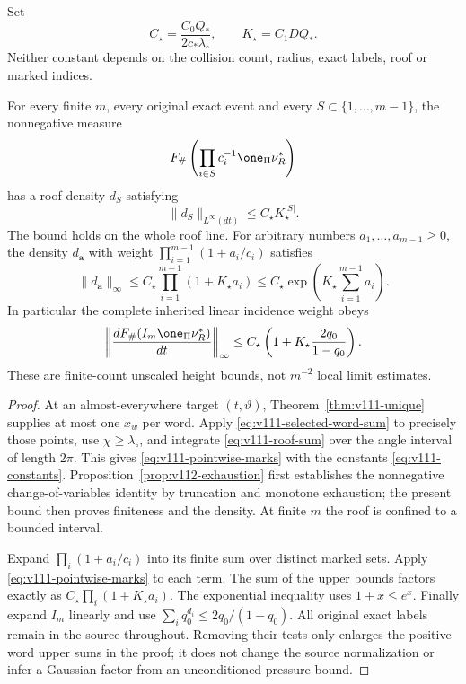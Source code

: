 Set
\begin{equation}\label{eq:v111-constants}
       C_\star=\frac{C_0Q_*}{2c_*\lambda_\circ},\qquad
       K_\star=C_1DQ_*.
\end{equation}
Neither constant depends on the collision count, radius, exact
labels, roof or marked indices.

\begin{theorem}
\label{thm:v111-roof-pressure}
For every finite $m$, every original exact event and every
$S\subset\{1,\ldots,m-1\}$, the nonnegative measure
\[
 F_\#\left(\prod_{i\in S}c_i^{-1}\one_\Pi\nu_R^*\right)
\]
has a roof density $d_S$ satisfying
\begin{equation}\label{eq:v111-pointwise-marks}
                    \|d_S\|_{L^\infty(dt)}\le C_\star K_\star^{|S|}.
\end{equation}
The bound holds on the whole roof line. For arbitrary numbers
$a_1,\ldots,a_{m-1}\ge0$, the density $d_{\boldsymbol a}$ with
weight $\prod_{i=1}^{m-1}(1+a_i/c_i)$ satisfies
\begin{equation}\label{eq:v111-product-insertion}
 \|d_{\boldsymbol a}\|_\infty
 \le C_\star\prod_{i=1}^{m-1}(1+K_\star a_i)
 \le C_\star\exp\left(K_\star\sum_{i=1}^{m-1}a_i\right).
\end{equation}
In particular the complete inherited linear incidence weight obeys
\begin{equation}\label{eq:v111-linear}
 \left\|\frac{dF_\#(I_m\one_\Pi\nu_R^*)}{dt}\right\|_\infty
 \le C_\star\left(1+K_\star\frac{2q_0}{1-q_0}\right).
\end{equation}
These are finite-count unscaled height bounds, not $m^{-2}$ local
limit estimates.
\end{theorem}
\begin{proof}
At an almost-everywhere target $(t,\vartheta)$,
Theorem~\ref{thm:v111-unique} supplies at most one $x_w$ per word.
Apply \eqref{eq:v111-selected-word-sum} to precisely those points,
use $\chi\ge\lambda_\circ$, and integrate
\eqref{eq:v111-roof-sum} over the angle interval of length $2\pi$.
This gives \eqref{eq:v111-pointwise-marks} with the constants
\eqref{eq:v111-constants}. Proposition~\ref{prop:v112-exhaustion} first establishes the
nonnegative change-of-variables identity by truncation and monotone
exhaustion; the present bound then proves finiteness and the density. At finite $m$ the
roof is confined to a bounded interval.

Expand $\prod_i(1+a_i/c_i)$ into its finite sum over distinct marked
sets. Apply \eqref{eq:v111-pointwise-marks} to each term. The sum
of the upper bounds factors exactly as
$C_\star\prod_i(1+K_\star a_i)$. The exponential inequality uses
$1+x\le e^x$. Finally expand $I_m$ linearly and use
$\sum_iq_0^{d_i}\le2q_0/(1-q_0)$.
All original exact labels remain in the source throughout. Removing
their tests only enlarges the positive word upper sums in the proof;
it does not change the source normalization or infer a Gaussian
factor from an unconditioned pressure bound.
\end{proof}

